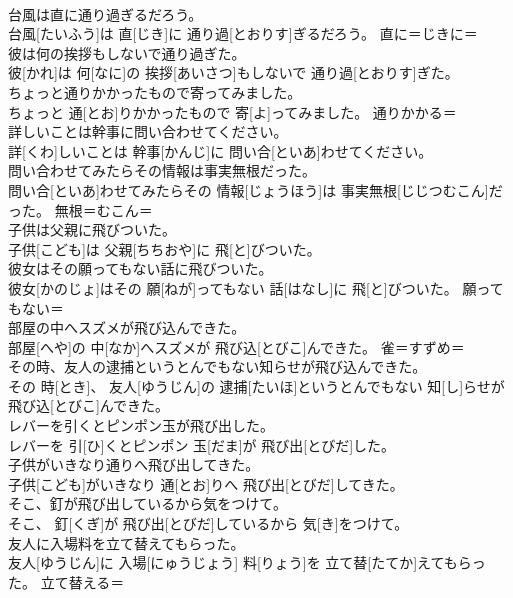 \documentclass[8pt]{extreport}
\begin{document}
\begin{CJK}{UTF8}{min}
{\\	台風は直に通り過ぎるだろう。	
\\	台風[たいふう]は 直[じき]に 通り過[とおりす]ぎるだろう。	直に＝じきに＝　
\\	彼は何の挨拶もしないで通り過ぎた。	
\\	彼[かれ]は 何[なに]の 挨拶[あいさつ]もしないで 通り過[とおりす]ぎた。	
\\	ちょっと通りかかったもので寄ってみました。	
\\	ちょっと 通[とお]りかかったもので 寄[よ]ってみました。	通りかかる＝ 
\\	詳しいことは幹事に問い合わせてください。	
\\	詳[くわ]しいことは 幹事[かんじ]に 問い合[といあ]わせてください。	
\\	問い合わせてみたらその情報は事実無根だった。	
\\	問い合[といあ]わせてみたらその 情報[じょうほう]は 事実無根[じじつむこん]だった。	無根＝むこん＝ 
\\	子供は父親に飛びついた。	
\\	子供[こども]は 父親[ちちおや]に 飛[と]びついた。	
\\	彼女はその願ってもない話に飛びついた。	
\\	彼女[かのじょ]はその 願[ねが]ってもない 話[はなし]に 飛[と]びついた。	願ってもない＝ 
\\	部屋の中へスズメが飛び込んできた。	
\\	部屋[へや]の 中[なか]へスズメが 飛び込[とびこ]んできた。	雀＝すずめ＝ 
\\	その時、友人の逮捕というとんでもない知らせが飛び込んできた。	
\\	その 時[とき]、 友人[ゆうじん]の 逮捕[たいほ]というとんでもない 知[し]らせが 飛び込[とびこ]んできた。	
\\	レバーを引くとピンポン玉が飛び出した。	
\\	レバーを 引[ひ]くとピンポン 玉[だま]が 飛び出[とびだ]した。	
\\	子供がいきなり通りへ飛び出してきた。	
\\	子供[こども]がいきなり 通[とお]りへ 飛び出[とびだ]してきた。	
\\	そこ、釘が飛び出しているから気をつけて。	
\\	そこ、 釘[くぎ]が 飛び出[とびだ]しているから 気[き]をつけて。	
\\	友人に入場料を立て替えてもらった。	
\\	友人[ゆうじん]に 入場[にゅうじょう] 料[りょう]を 立て替[たてか]えてもらった。	立て替える＝ 
}
\end{CJK}
\end{document}
